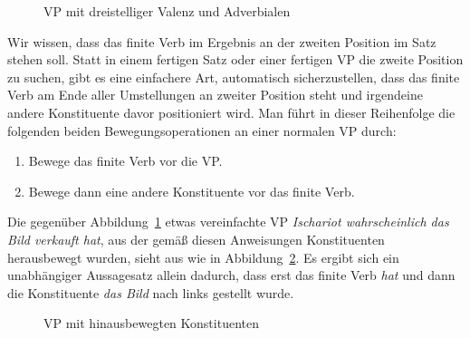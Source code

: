 \begin{figure}[!htbp]
  \caption{VP mit dreistelliger Valenz und Adverbialen}
  \label{fig:vgreinstelligwh}
\end{figure}

Wir wissen, dass das finite Verb im Ergebnis an der zweiten Position im Satz stehen soll.
Statt in einem fertigen Satz oder einer fertigen VP die zweite Position zu suchen, gibt es eine einfachere Art, automatisch sicherzustellen, dass das finite Verb am Ende aller Umstellungen an zweiter Position steht und irgendeine andere Konstituente davor positioniert wird.
Man führt in dieser Reihenfolge die folgenden beiden Bewegungsoperationen an einer normalen VP durch:

\Enl[1.5]

\begin{enumerate}\Lf
  \item Bewege das finite Verb vor die VP.
  \item Bewege dann eine andere Konstituente vor das finite Verb.
\end{enumerate}

Die gegenüber Abbildung~\ref{fig:vgreinstelligwh} etwas vereinfachte VP \textit{Ischariot wahrscheinlich das Bild verkauft hat}, aus der gemäß diesen Anweisungen Konstituenten herausbewegt wurden, sieht aus wie in Abbildung~\ref{fig:movev2}.
Es ergibt sich ein unabhängiger Aussagesatz allein dadurch, dass erst das finite Verb \textit{hat} und dann die Konstituente \textit{das Bild} nach links gestellt wurde.

\begin{figure}[!htbp]
  \caption{VP mit hinausbewegten Konstituenten}
  \label{fig:movev2}
\end{figure}

